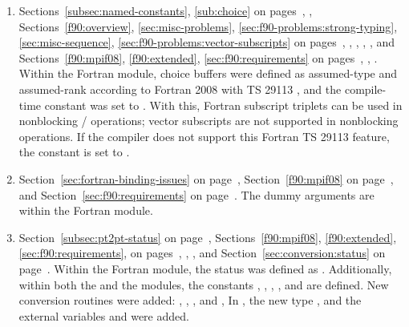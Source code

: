 \begin{enumerate}
\item 
Sections~\ref{subsec:named-constants}, \ref{sub:choice} 
on pages~\pageref{subsec:named-constants}, \pageref{sub:choice},  
Sections~\ref{f90:overview}, \ref{sec:misc-problems}, 
\ref{sec:f90-problems:strong-typing}, \ref{sec:misc-sequence}, 
\ref{sec:f90-problems:vector-subscripts}
on pages~\pageref{f90:overview}, \pageref{sec:misc-problems}, 
\pageref{sec:f90-problems:strong-typing}, \pageref{sec:misc-sequence}, 
\pageref{sec:f90-problems:vector-subscripts}, and
Sections~\ref{f90:mpif08}, \ref{f90:extended}, \ref{sec:f90:requirements}
on pages~\pageref{f90:mpif08}, \pageref{f90:extended}, \pageref{sec:f90:requirements}.
\newline 
Within the  Fortran module, 
choice buffers were defined as assumed-type and assumed-rank 
according to Fortran 2008 with TS 29113
\cite{fortran2008:ts29113-interop},
and the compile-time constant  was set to .
With this, Fortran subscript triplets can be used in nonblocking \MPI/ operations;
vector subscripts are not supported in nonblocking operations. 
If the compiler does not support this Fortran
TS 29113 feature,
the constant is set to .
 
\item 
Section~\ref{sec:fortran-binding-issues} on page~\pageref{sec:fortran-binding-issues},
Section~\ref{f90:mpif08} on page~\pageref{f90:mpif08}, and
Section~\ref{sec:f90:requirements} on page~\pageref{sec:f90:requirements}.
\newline 
The  dummy arguments are  within the  Fortran module. 
 
\item 
Section~\ref{subsec:pt2pt-status} on page~\pageref{subsec:pt2pt-status},
Sections~\ref{f90:mpif08}, \ref{f90:extended}, \ref{sec:f90:requirements}, 
on pages~\pageref{f90:mpif08}, \pageref{f90:extended}, \pageref{sec:f90:requirements}, 
and Section~\ref{sec:conversion:status} on page~\pageref{sec:conversion:status}. 
\newline 
Within the  Fortran module,
the status was defined as . 
Additionally, within both the  and the  modules,
the constants , 
, , ,
and 
are defined.
New conversion routines were added: 
, 
, 
, and
, 
In , the new type , 
and the external variables  and  were added. 
 

\end{enumerate}
